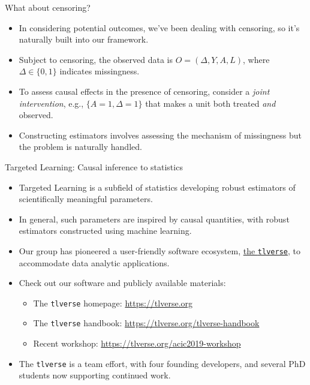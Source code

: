 \documentclass[ignorenonframetext,]{beamer}
\providecommand{\tightlist}{%
  \setlength{\itemsep}{0pt}\setlength{\parskip}{0pt}}
\begin{document}
\begin{frame}{What about censoring?}
\protect\hypertarget{what-about-censoring}{}

\begin{itemize}[<+->]
\tightlist
\item
  In considering potential outcomes, we've been dealing with censoring,
  so it's naturally built into our framework.
\item
  Subject to censoring, the observed data is \(O = (\Delta, Y, A, L)\),
  where \(\Delta \in \{0,1\}\) indicates missingness.
\item
  To assess causal effects in the presence of censoring, consider a
  \emph{joint intervention}, e.g., \(\{A = 1, \Delta = 1\}\) that makes
  a unit both treated \emph{and} observed.
\item
  Constructing estimators involves assessing the mechanism of
  missingness but the problem is naturally handled.
\end{itemize}

\end{frame}

\begin{frame}[fragile]{Targeted Learning: Causal inference to
statistics}
\protect\hypertarget{targeted-learning-causal-inference-to-statistics}{}

\begin{itemize}[<+->]
\tightlist
\item
  Targeted Learning is a subfield of statistics developing robust
  estimators of scientifically meaningful parameters.
\item
  In general, such parameters are inspired by causal quantities, with
  robust estimators constructed using machine learning.
\item
  Our group has pioneered a user-friendly software ecosystem,
  \href{https://tlverse.org}{the \texttt{tlverse}}, to accommodate data
  analytic applications.
\item
  Check out our software and publicly available materials:

  \begin{itemize}[<+->]
  \tightlist
  \item
    The \texttt{tlverse} homepage: \url{https://tlverse.org}
  \item
    The \texttt{tlverse} handbook:
    \url{https://tlverse.org/tlverse-handbook}
  \item
    Recent workshop: \url{https://tlverse.org/acic2019-workshop}
  \end{itemize}
\item
  The \texttt{tlverse} is a team effort, with four founding developers,
  and several PhD students now supporting continued work.
\end{itemize}

\end{frame}
\end{document}
